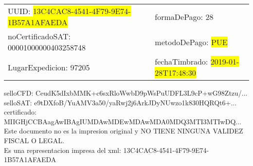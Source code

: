 \documentclass{article}
\begin{document}
\begin{tabular}{p{11cm}p{1cm}p{8cm}}
\bigskip
UUID: \colorbox{yellow}{ 13C4CAC8-4541-4F79-9E74-1B57A1AFAEDA } & & formaDePago: 28\\

noCertificadoSAT: 00001000000403258748 & & metodoDePago: \colorbox{yellow}{ PUE }\\

LugarExpedicion: 97205 & & fechaTimbrado: \colorbox{yellow}{ 2019-01-28T17:48:30 } \\
\end{tabular}

\bigskip
selloCFD: CeudK5dIxbMMK+c6sxRloWwbD9pWsPuUDFL3L9cP+wG98Ztzu/... \\
selloSAT: e9tDXfoB/YuAMV3a50/yaRwj2j6ArkJDyNUwzo1k830HQRQt6+... \\

certificado: MIIGHjCCBAagAwIBAgIUMDAwMDEwMDAwMDA0MDQ3MTI3MTIwDQ...\bigskip\bigskip\bigskip\bigskip\bigskip\bigskip
\\Este documento no es la impresion original y NO TIENE NINGUNA VALIDEZ FISCAL O LEGAL. \\
 Es una representacion impresa del xml:  13C4CAC8-4541-4F79-9E74-1B57A1AFAEDA \\
\end{document}
